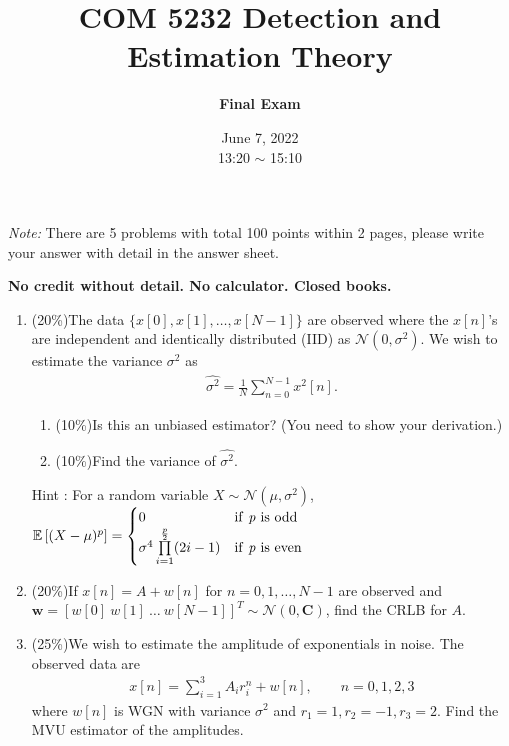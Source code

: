 \documentclass[a4paper,12pt]{article}
\title{\textbf{COM 5232 Detection and Estimation Theory}}
\author{\textbf{Final Exam}}
\date{June 7, 2022\\
13:20 $\sim$ 15:10
}
\begin{document}
    \maketitle
    \textit{Note: }There are 5 problems with total 100 points within 2 pages, please write your answer with detail in the answer sheet.

    {\bf No credit without detail.  No calculator. Closed books.}

    \begin{enumerate}
        \item 
        (20\%)The data $\{x[0],x[1],\dots,x[N-1]\}$ are observed where the $x[n]$'s are independent and identically distributed (IID) as $\mathcal N(0,\sigma^2)$. We wish to estimate the variance $\sigma^2$ as
        \begin{align*}
            \widehat{\sigma^2}=\frac{1}{N}\sum\limits_{n=0}^{N-1}x^2[n].
        \end{align*}
        \begin{enumerate}
            \item (10\textdegree \%)Is this an unbiased estimator? (You need to show your derivation.)
            \item (10\%)Find the variance of $\widehat{\sigma^2}$.
        \end{enumerate}
        
        Hint : For a random variable $X\sim\mathcal N(\mu,\sigma^2)$, $\mathbb E\left[(X-\mu)^p\right]=
        \begin{cases}
        0  &   {\rm if\ \mathit{p}\ is\ odd}\\
        \sigma^4\prod\limits_{i=1}^{\frac{p}{2}}(2i-1)  &   {\rm if\ \mathit{p}\ is\ even}
        \end{cases}$
        \item
        (20\%)If $x[n]=A+w[n]$ for $n=0,1,\dots,N-1$ are observed and $\mathbf w=[w[0]\ w[1]\ \dots\ w[N-1]]^T\sim\mathcal N(0,\mathbf C)$, find the CRLB for $A$.
        \item
        (25\%)We wish to estimate the amplitude of exponentials in noise. The observed data are
        \begin{align*}
            x[n]=\sum\limits_{i=1}^{3}A_ir_i^n+w[n],\qquad n=0,1,2,3
        \end{align*}
        where $w[n]$ is WGN with variance $\sigma^2$ and $r_1=1,r_2=-1,r_3=2$. Find the MVU estimator of the amplitudes.
        

\end{enumerate}
\end{document}
